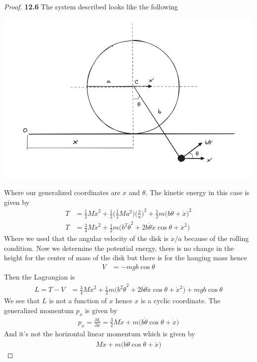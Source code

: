 \documentclass[11pt]{article}
\theoremstyle{definition}
\begin{document}
\cleardoublepage
\begin{proof}{\textbf{12.6}}
    The system described looks like the following
    \begin{center}
        \includegraphics[scale=0.45]{ch12-6.png}
    \end{center}
    Where our generalized coordinates are $x$ and $\theta$.
    The kinetic energy in this case is given by
    \begin{align*}
        T &= \frac{1}{2}M \dot x^2
        + \frac{1}{2}\bigg(\frac{1}{2}Ma^2\bigg) \bigg(\frac{\dot{x}}{a}\bigg)^2
        + \frac{1}{2}m\bigg(b\dot\theta + \dot x\bigg)^2\\
        T &= \frac{3}{4}M\dot{x}^2 + \frac{1}{2}m\bigg(b^2\dot{\theta}^2
        + 2b\dot\theta\dot x\cos\theta
        + \dot x^2\bigg) 
    \end{align*}
    Where we used that the angular velocity of the disk is $\dot{x}/a$ because
    of the rolling condition. 
    Now we determine the potential energy, there is no change in the height
    for the center of mass of the disk but there is for the hanging mass hence
    \begin{align*}
        V &= - mgb\cos\theta
    \end{align*}
    Then the Lagrangian is
    \begin{align*}
        L = T - V &= \frac{3}{4}M\dot{x}^2 + \frac{1}{2}m\bigg(b^2\dot{\theta}^2
        + 2b\dot\theta\dot x\cos\theta
        + \dot x^2\bigg) + mgb\cos\theta
    \end{align*}
    We see that $L$ is not a function of $x$ hence $x$ is a cyclic coordinate.
    The generalized momentum $p_x$ is given by
    \begin{align*}
        p_x = \frac{\partial L}{\partial \dot{x}} = 
        \frac{3}{2}M\dot{x} + m\bigg(b\dot\theta\cos\theta + \dot x\bigg)
    \end{align*}
    And it's not the horizontal linear momentum which is given by
    \begin{align*}
        M\dot{x} + m\bigg(b\dot\theta\cos\theta + \dot x\bigg)
    \end{align*}


\end{proof}
\end{document}
